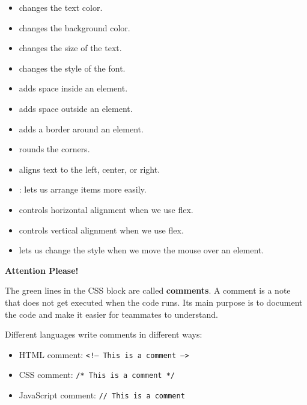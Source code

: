 \documentclass{article}
\begin{document}
\begin{itemize}[leftmargin=1.2cm, itemsep=4pt]
  \item {} changes the text color.
  \item {} changes the background color.
  \item {} changes the size of the text.
  \item {} changes the style of the font.
  \item {} adds space inside an element.
  \item {} adds space outside an element.
  \item {} adds a border around an element.
  \item {} rounds the corners.
  \item {} aligns text to the left, center, or right.
  \item {}:  lets us arrange items more easily.
  \item {} controls horizontal alignment when we use flex.
  \item {} controls vertical alignment when we use flex.
  \item {} lets us change the style when we move the mouse over an element.
\end{itemize}

\vspace{0.4cm}

\begin{attentionbox}
  \textbf{\Bitter\textcolor{naranja}{Attention Please!}}

  The green lines in the CSS block are called \textbf{comments}. A comment is a note that does not get executed when the code runs. Its main purpose is to document the code and make it easier for teammates to understand.

  \vspace{0.15cm}

  Different languages write comments in different ways:

  \begin{itemize}[leftmargin=1.2cm, itemsep=4pt]
    \item HTML comment: \texttt{\textcolor{csscommentgreen}{<!-- This is a comment -->}}
    \item CSS comment: \texttt{\textcolor{csscommentgreen}{/* This is a comment */}}
    \item JavaScript comment: \texttt{\textcolor{csscommentgreen}{// This is a comment}}
  \end{itemize}

\end{attentionbox}
\end{document}
